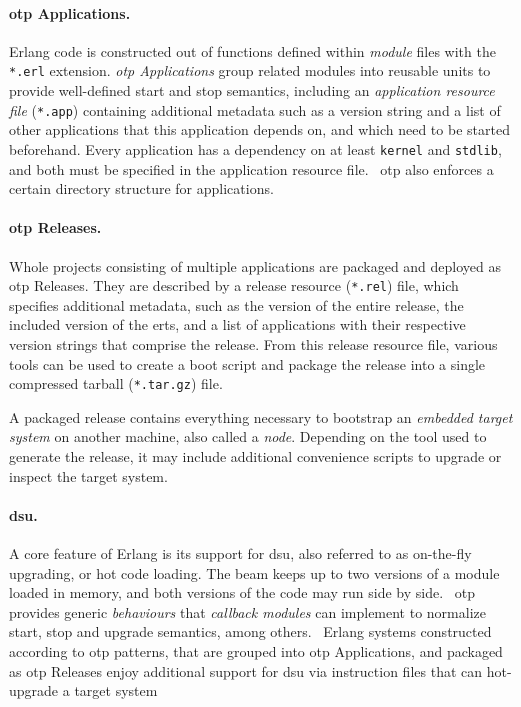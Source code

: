 \paragraph{\acrshort{otp} Applications.}
Erlang code is constructed out of functions defined within \mbox{\emph{module}} files with the \lstinline|*.erl| extension. \emph{\acrshort{otp} Applications} group related modules into reusable units to provide well-defined start and stop semantics, including an \emph{application resource file} (\lstinline|*.app|) containing additional metadata such as a version string and a list of other applications that this application depends on, and which need to be started beforehand. Every application has a dependency on at least \lstinline|kernel| and \lstinline|stdlib|, and both must be specified in the application resource file.~\cite{doc:otp}
\acrshort{otp} also enforces a certain directory structure for applications.~\cite{logan:otp}

\paragraph{\acrshort{otp} Releases.} Whole projects consisting of multiple applications are packaged and deployed as \acrshort{otp} Releases. They are described by a release resource (\lstinline|*.rel|) file, which specifies additional metadata, such as the version of the entire release, the included version of the \acrfull{erts}, and a list of applications with their respective version strings that comprise the release. From this release resource file, various tools can be used to create a boot script and package the release into a single compressed tarball (\lstinline|*.tar.gz|) file.~\cite{doc:otp}

A packaged release contains everything necessary to bootstrap an \emph{embedded target system} on another machine, also called a \emph{node}. Depending on the tool used to generate the release, it may include additional convenience scripts to upgrade or inspect the target system.

\paragraph{\acrlong{dsu}.} A core feature of Erlang is its support for \acrfull{dsu}, also referred to as on-the-fly upgrading, or hot code loading. The \acrshort{beam} keeps up to two versions of a module loaded in memory, and both versions of the code may run side by side.~\cite{cesarini:otp} \acrshort{otp} provides generic \emph{behaviours} that \emph{callback modules} can implement to normalize start, stop and upgrade semantics, among others.~\cite{doc:otp} Erlang systems constructed according to \acrshort{otp} patterns, that are grouped into \acrshort{otp} Applications, and packaged as \acrshort{otp} Releases enjoy additional support for \acrshort{dsu} via instruction files that can hot-upgrade a target system

